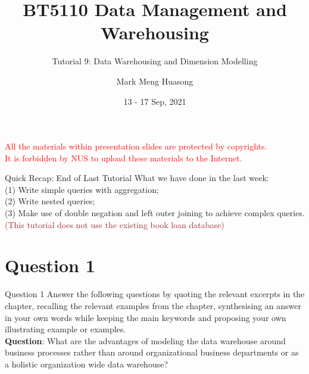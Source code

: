 \title{BT5110 Data Management and Warehousing}

\subtitle{Tutorial 9: Data Warehousing and Dimension Modelling}

\author{Mark Meng Huasong}



\date{13 - 17 Sep, 2021}

\begin{frame}
	\titlepage
	\begin{tcolorbox}
		\begin{center}
			{\scriptsize \textcolor{red}{All the materials within presentation slides are protected by copyrights.\\
					It is forbidden by NUS to upload these materials to the Internet.}}
		\end{center}
	\end{tcolorbox}
\end{frame}

\begin{frame}[fragile]{Quick Recap: End of Last Tutorial}
	What we have done in the last week:\\\vspace{5pt}
	(1) Write simple queries with aggregation;\\
	(2) Write nested queries;\\
	(3) Make use of double negation and left outer joining to achieve complex queries. \\\vspace{5pt}
	\textcolor{brown}{(This tutorial does not use the existing book loan database)}
\end{frame}

\section*{Question 1}

\begin{frame}[fragile]{Question 1}
Answer the following questions by quoting the relevant excerpts in the chapter, recalling the relevant examples from the chapter, synthesising an answer in your own words while keeping the main keywords and proposing your own illustrating example or examples.\\\vspace{10pt}
\textbf{Question}: What are the advantages of modeling the data warehouse around business processes rather than around organizational business departments or as a holistic organization wide data warehouse?
\end{frame}

